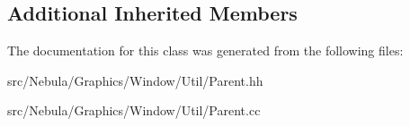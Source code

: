 \subsection*{Additional Inherited Members}


The documentation for this class was generated from the following files\-:\begin{DoxyCompactItemize}
\item 
src/\-Nebula/\-Graphics/\-Window/\-Util/Parent.\-hh\item 
src/\-Nebula/\-Graphics/\-Window/\-Util/Parent.\-cc\end{DoxyCompactItemize}
